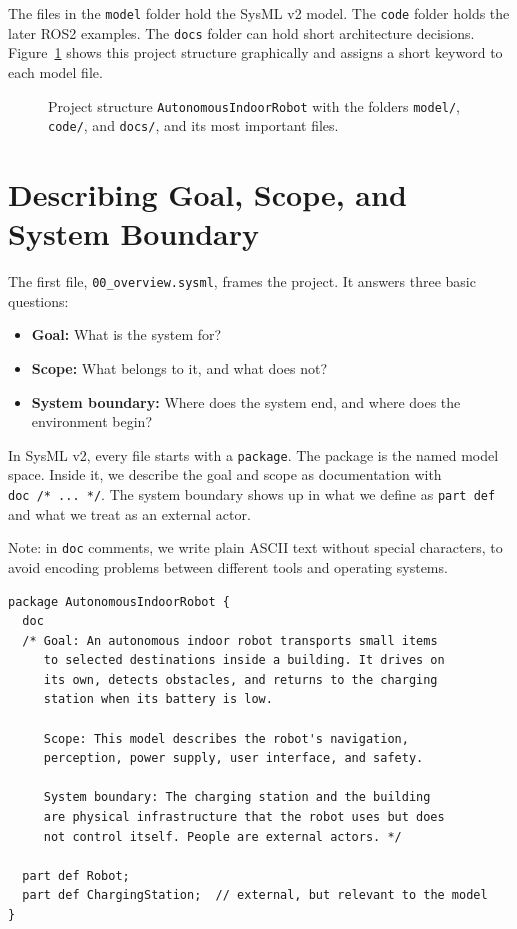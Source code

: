 The files in the \texttt{model} folder hold the SysML v2 model. The \texttt{code} folder holds the later ROS2 examples. The \texttt{docs} folder can hold short architecture decisions. Figure~\ref{fig:kap04-projektstruktur} shows this project structure graphically and assigns a short keyword to each model file.

\begin{figure}[H]
  \centering
  \caption{Project structure \texttt{AutonomousIndoorRobot} with the folders \texttt{model/}, \texttt{code/}, and \texttt{docs/}, and its most important files.}
  \label{fig:kap04-projektstruktur}
\end{figure}

\section{Describing Goal, Scope, and System Boundary}

The first file, \texttt{00\_overview.sysml}, frames the project. It answers three basic questions:

\begin{itemize}
    \item \textbf{Goal:} What is the system for?
    \item \textbf{Scope:} What belongs to it, and what does not?
    \item \textbf{System boundary:} Where does the system end, and where does the environment begin?
\end{itemize}

In SysML v2, every file starts with a \texttt{package}. The package is the named model space. Inside it, we describe the goal and scope as documentation with \texttt{doc~/*~...~*/}. The system boundary shows up in what we define as \texttt{part def} and what we treat as an external actor.

Note: in \texttt{doc} comments, we write plain ASCII text without special characters, to avoid encoding problems between different tools and operating systems.

\begin{lstlisting}
package AutonomousIndoorRobot {
  doc
  /* Goal: An autonomous indoor robot transports small items
     to selected destinations inside a building. It drives on
     its own, detects obstacles, and returns to the charging
     station when its battery is low.

     Scope: This model describes the robot's navigation,
     perception, power supply, user interface, and safety.

     System boundary: The charging station and the building
     are physical infrastructure that the robot uses but does
     not control itself. People are external actors. */

  part def Robot;
  part def ChargingStation;  // external, but relevant to the model
}
\end{lstlisting}

